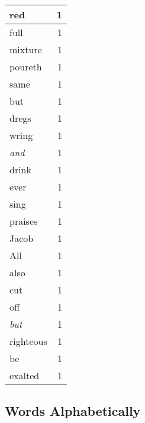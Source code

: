 \begin{center}
\begin{longtable}{l|r}
red & 1 \\ \hline
full & 1 \\ \hline
mixture & 1 \\ \hline
poureth & 1 \\ \hline
same & 1 \\ \hline
but & 1 \\ \hline
dregs & 1 \\ \hline
wring & 1 \\ \hline
\emph{and} & 1 \\ \hline
drink & 1 \\ \hline
ever & 1 \\ \hline
sing & 1 \\ \hline
praises & 1 \\ \hline
Jacob & 1 \\ \hline
All & 1 \\ \hline
also & 1 \\ \hline
cut & 1 \\ \hline
off & 1 \\ \hline
\emph{but} & 1 \\ \hline
righteous & 1 \\ \hline
be & 1 \\ \hline
exalted & 1 \\ \hline
\end{longtable}
\end{center}



\normalsize



\subsection{Words Alphabetically}

